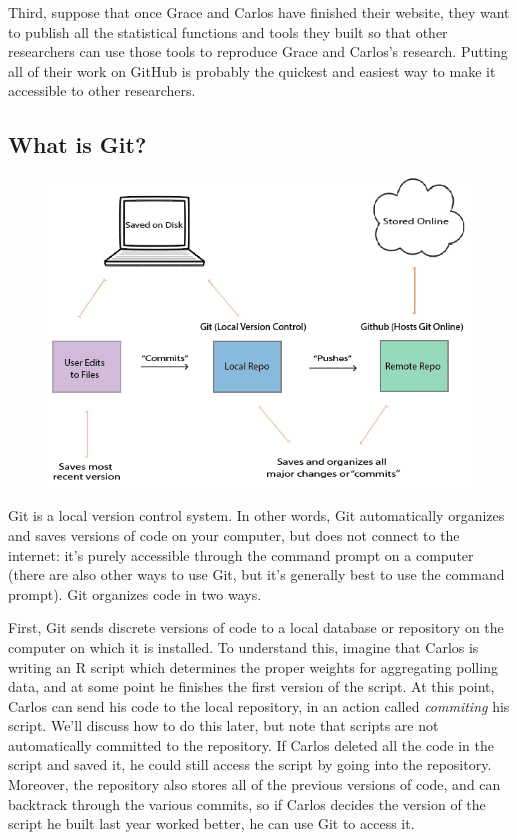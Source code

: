 \documentclass[]{book}
\begin{document}
Third, suppose that once Grace and Carlos have finished their website,
they want to publish all the statistical functions and tools they built
so that other researchers can use those tools to reproduce Grace and
Carlos's research. Putting all of their work on GitHub is probably the
quickest and easiest way to make it accessible to other researchers.

\subsection{What is Git?}\label{what-is-git}

\begin{figure}
\centering
\includegraphics{images/gitgraphic.PNG}
\caption{}
\end{figure}

Git is a local version control system. In other words, Git automatically
organizes and saves versions of code on your computer, but does not
connect to the internet: it's purely accessible through the command
prompt on a computer (there are also other ways to use Git, but it's
generally best to use the command prompt). Git organizes code in two
ways.

First, Git sends discrete versions of code to a local database or
repository on the computer on which it is installed. To understand this,
imagine that Carlos is writing an R script which determines the proper
weights for aggregating polling data, and at some point he finishes the
first version of the script. At this point, Carlos can send his code to
the local repository, in an action called \emph{commiting} his script.
We'll discuss how to do this later, but note that scripts are not
automatically committed to the repository. If Carlos deleted all the
code in the script and saved it, he could still access the script by
going into the repository. Moreover, the repository also stores all of
the previous versions of code, and can backtrack through the various
commits, so if Carlos decides the version of the script he built last
year worked better, he can use Git to access it.
\end{document}

